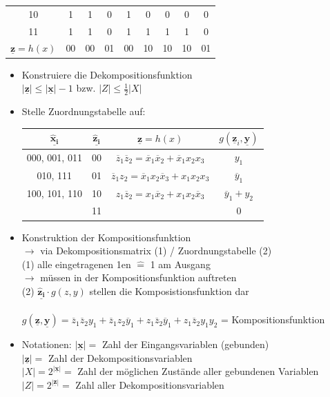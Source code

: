 \documentclass[6pt,a4paper]{scrartcl}
\renewcommand{\vec}[1]{\ensuremath{\underline{\boldsymbol {#1}}}}
\newcommand{\abs}[1]{\ensuremath{\left\vert#1\right\vert}} 							%
\newcommand{\ra}[0]{\ensuremath{\rightarrow}} 									%
\renewcommand{\vec}[1]{\ensuremath{\underline{\boldsymbol {#1}}}}
\begin{document}
\begin{multicols}{3}
\begin{tabular}{c | c | c | c | c | c | c | c | c }
			10 & 1 & 1 & 0 & 1 & 0 & 0 & 0 & 0 \\
			11 & 1 & 1 & 0 & 1 & 1 & 1 & 1 & 0 \\ \midrule
			$\vec z = h(x)$ & 00 & 00 & 01 & 00 & 10 & 10 & 10 & 01
		\end{tabular}
\begin{itemize}
	\item Konstruiere die Dekompositionsfunktion \\
	$ \abs{\vec z} \le \abs{\vec x}  -1 $ bzw. $\abs{Z} \le \frac{1}{2} \abs{X}$
	\item Stelle Zuordnungstabelle auf:\\
		\begin{tabular}{ c | c | c | c }
		$\vec{\hat x_i}$ & $\vec{\hat z_i}$ & $\vec z = h(x)$ & $ g(\vec z_i, \vec y) $ \\ \midrule
		000, 001, 011 & 00 & $\overline z_1 \overline z_2 = \overline x_1 \overline x_2 + \overline x_1 x_2 x_3$ & $y_1 $\\
		010, 111 & 01 &$ \overline z_1 z_2 = \overline x_1 x_2 \overline x_3 + x_1 x_2 x_3$  & $\overline y_1$ \\
		100, 101, 110 & 10 & $z_1 \overline z_2 = x_1 \overline x_2 + x_1 x_2 \overline x_3$ & $\overline y_1 + y_2$ \\
		& 11 & & 0
		\end{tabular}
		
	\item Konstruktion der Kompositionsfunktion \\
	$\ra $ via Dekompositionsmatrix (1) / Zuordnungstabelle (2) \\
		(1) alle eingetragenen 1en $\hat =$ 1 am Ausgang \\
			$\ra$ müssen in der Kompositionsfunktion auftreten \\
		(2) $\vec{\hat z_i} \cdot g(z,y)$ stellen die Komposistionsfunktion dar \\
		\\
	$g(\vec z, \vec y) = \overline z_1 \overline z_2 y_1 + \overline z_1 z_2 \overline y_1 + z_1 \overline z_2 \overline y_1 + z_1 \overline z_2 y_1 y_2 $ = Kompositionsfunktion
	
	\item Notationen:
		$\abs{\vec x} = $ Zahl der Eingangsvariablen (gebunden) \\
		$\abs{\vec z} = $ Zahl der Dekompositionsvariablen \\
		$\abs{X} = 2^{\abs{\vec x}} =$ Zahl der möglichen Zustände aller gebundenen Variablen \\
		$\abs{Z} = 2^{\abs{\vec z}} = $ Zahl aller Dekompositionsvariablen
\end{itemize}


\end{multicols}
\end{document}
